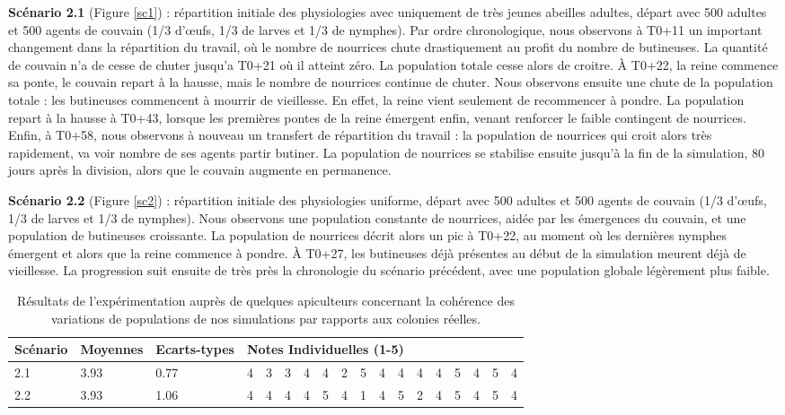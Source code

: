 		\textbf{Scénario 2.1} (Figure \ref{sc1}) : répartition initiale des physiologies avec uniquement de très jeunes abeilles adultes, départ avec 500 adultes et 500 agents de couvain (1/3 d'œufs, 1/3 de larves et 1/3 de nymphes). Par ordre chronologique, nous observons à T0+11 un important changement dans la répartition du travail, où le nombre de nourrices chute drastiquement au profit du nombre de butineuses. La quantité de couvain n'a de cesse de chuter jusqu'a T0+21 où il atteint zéro. La population totale cesse alors de croitre. À T0+22, la reine commence sa ponte, le couvain repart à la hausse, mais le nombre de nourrices continue de chuter. Nous observons ensuite une chute de la population totale : les butineuses commencent à mourrir de vieillesse. En effet, la reine vient seulement de recommencer à pondre. La population repart à la hausse à T0+43, lorsque les premières pontes de la reine émergent enfin, venant renforcer le faible contingent de nourrices. Enfin, à T0+58, nous observons à nouveau un transfert de répartition du travail : la population de nourrices qui croit alors très rapidement, va voir nombre de ses agents partir butiner. La population de nourrices se stabilise ensuite jusqu'à la fin de la simulation, 80 jours après la division, alors que le couvain augmente en permanence.
		
		\textbf{Scénario 2.2} (Figure \ref{sc2}) : répartition initiale des physiologies uniforme, départ avec 500 adultes et 500 agents de couvain (1/3 d'œufs, 1/3 de larves et 1/3 de nymphes). Nous observons une population constante de nourrices, aidée par les émergences du couvain, et une population de butineuses croissante. La population de nourrices décrit alors un pic à T0+22, au moment où les dernières nymphes émergent et alors que la reine commence à pondre. À T0+27, les butineuses déjà présentes au début de la simulation meurent déjà de vieillesse. La progression suit ensuite de très près la chronologie du scénario précédent, avec une population globale légèrement plus faible.
	
	
	\begin{table}
	\centering
	\begin{tabular}{l|l|l|lllllllllllllll}
	Scénario & Moyennes & Ecarts-types & \multicolumn{15}{l}{Notes Individuelles (1-5)}\\
	\hline
	2.1 & 3.93 & 0.77 &4&3&3&4&4&2&5&4&4&4&4&5&4&5&4\\
	2.2 & 3.93 & 1.06 &4&4&4&4&5&4&1&4&5&2&4&5&4&5&4\\	
	\end{tabular}
	\caption{Résultats de l'expérimentation auprès de quelques apiculteurs concernant la cohérence des variations de populations de nos simulations par rapports aux colonies réelles.}
	\label{TabResCoherence}
	\end{table}
	
